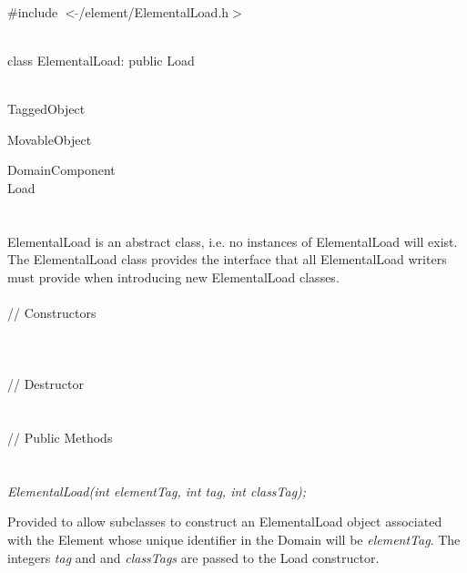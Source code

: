 
   \\
\#include $<\tilde{ }$/element/ElementalLoad.h$>$  


  \\
class ElementalLoad: public Load 


 \\
TaggedObject 

MovableObject 

\indent\indent DomainComponent \\
\indent\indent\indent Load \\
\indent\indent\indent{} \\

  \\
\indent ElementalLoad is an abstract class, i.e. no instances of
ElementalLoad will exist. The ElementalLoad class provides the
interface that all ElementalLoad writers must provide when
introducing new ElementalLoad classes. \\ 

 \\
\indent\indent // Constructors \\
\indent{}  \\ 
\indent{}  \\ \\
\indent\indent // Destructor \\
\indent{}\\ \\
\indent\indent // Public Methods  \\
\indent{} \\



  \\
{\em ElementalLoad(int elementTag, int tag, int classTag);}  

Provided to allow subclasses to construct an ElementalLoad object
associated with the Element whose unique identifier in the Domain will
be {\em elementTag}. The integers {\em tag} and and {\em classTags}
are passed to the Load constructor. \\ 

